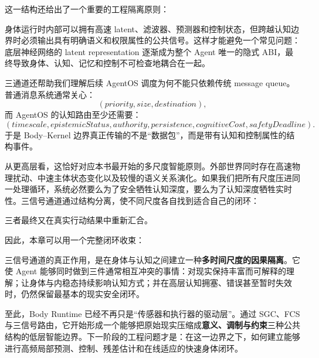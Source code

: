 这一结构还给出了一个重要的工程隔离原则：
\begin{statementbox}
\centering
{}
\end{statementbox}
身体运行时内部可以拥有高速 latent、滤波器、预测器和控制状态，但跨越认知边界时必须输出具有明确语义和权限属性的公共信号。这样才能避免一个常见问题：底层神经网络的 latent representation 逐渐成为整个 Agent 唯一的隐式 ABI，最终导致身体、认知、记忆和控制不可检查地耦合在一起。

三通道还帮助我们理解后续 AgentOS 调度为何不能只依赖传统 message queue。普通消息系统通常关心：
\[
(priority,size,destination),
\]
而 AgentOS 的认知路由至少还需要：
\[
(timescale,
epistemicStatus,
authority,
persistence,
cognitiveCost,
safetyDeadline).
\]
于是 Body--Kernel 边界真正传输的不是“数据包”，而是带有认知和控制属性的结构事件。

从更高层看，这恰好对应本书最开始的多尺度智能原则。外部世界同时存在高速物理扰动、中速主体状态变化以及较慢的语义关系演化。如果我们把所有尺度压进同一处理循环，系统必然要么为了安全牺牲认知深度，要么为了认知深度牺牲实时性。三信号通道通过结构分离，使不同尺度各自找到适合自己的闭环：
\begin{statementbox}
\centering
{}
\end{statementbox}
三者最终又在真实行动结果中重新汇合。

因此，本章可以用一个完整闭环收束：
\begin{statementbox}
\centering
{}
\end{statementbox}

三信号通道的真正作用，是在身体与认知之间建立一种\textbf{多时间尺度的因果隔离}。它使 Agent 能够同时做到三件通常相互冲突的事情：对现实保持丰富而可解释的理解；让身体与内稳态持续影响认知方式；并在高层认知拥塞、错误甚至暂时失效时，仍然保留最基本的现实安全闭环。

至此，Body Runtime 已经不再只是“传感器和执行器的驱动层”。通过 SGC、FCS 与三信号路由，它开始形成一个能够把原始现实压缩成\textbf{意义、调制与约束}三种公共结构的低层智能边界。下一阶段的工程问题才是：在这一边界之下，如何建立能够进行高频局部预测、控制、残差估计和在线适应的快速身体闭环。
